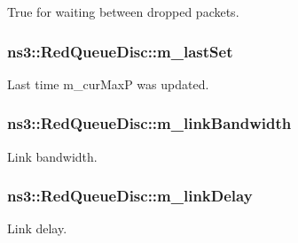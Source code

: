 True for waiting between dropped packets. 

\subsubsection[{\texorpdfstring{m\+\_\+last\+Set}{m_lastSet}}]{ ns3\+::\+Red\+Queue\+Disc\+::m\+\_\+last\+Set\hspace{0.3cm}{\ttfamily [private]}}\hypertarget{classns3_1_1RedQueueDisc_a9ccc3f308a4f15ae970499e7545b360f}{}\label{classns3_1_1RedQueueDisc_a9ccc3f308a4f15ae970499e7545b360f}


Last time m\+\_\+cur\+MaxP was updated. 

\subsubsection[{\texorpdfstring{m\+\_\+link\+Bandwidth}{m_linkBandwidth}}]{ ns3\+::\+Red\+Queue\+Disc\+::m\+\_\+link\+Bandwidth\hspace{0.3cm}{\ttfamily [private]}}\hypertarget{classns3_1_1RedQueueDisc_a036e8100b2bc17d9b7c3bf5184126f95}{}\label{classns3_1_1RedQueueDisc_a036e8100b2bc17d9b7c3bf5184126f95}


Link bandwidth. 

\subsubsection[{\texorpdfstring{m\+\_\+link\+Delay}{m_linkDelay}}]{ ns3\+::\+Red\+Queue\+Disc\+::m\+\_\+link\+Delay\hspace{0.3cm}{\ttfamily [private]}}\hypertarget{classns3_1_1RedQueueDisc_a0109dcd4dab3f32348454bc24c991683}{}\label{classns3_1_1RedQueueDisc_a0109dcd4dab3f32348454bc24c991683}


Link delay. 

